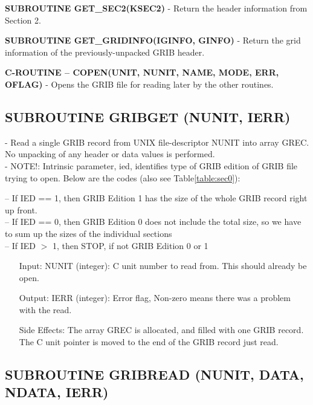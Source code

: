 \textbf{SUBROUTINE GET\_SEC2(KSEC2) }
      - Return the header information from Section 2.                         
                                                                           
\textbf{SUBROUTINE GET\_GRIDINFO(IGINFO, GINFO) }
      - Return the grid information of the previously-unpacked GRIB header.   

\textbf{C-ROUTINE -- COPEN(UNIT, NUNIT, NAME, MODE, ERR, OFLAG)}
      - Opens the GRIB file for reading later by the other routines. 


\subsection{ SUBROUTINE GRIBGET (NUNIT, IERR)} 
  
    - Read a single GRIB record from UNIX file-descriptor NUNIT into array   
        GREC. No unpacking of any header or data values is performed.   \\
    - NOTE!:  Intrinsic parameter, ied, identifies type of GRIB edition of GRIB file trying to open.  Below are the codes (also see Table\ref{table:sec0}):

     -- If IED == 1, then GRIB Edition 1 has the size of the whole GRIB record right up front.\\
     -- If IED == 0, then GRIB Edition 0 does not include the total size, so we have to sum up  the sizes of the individual sections \\
     -- If IED $>$ 1, then STOP, if not GRIB Edition 0 or 1\\

\begin{itemize}
 \item[Input: ]
     NUNIT (integer):  C unit number to read from.  This should already be open. \item[Output:]      
     IERR (integer): Error flag, Non-zero means there was a problem with the read.    
                                                                           
\item[Side Effects:]                                                             
        The array GREC is allocated, and filled with one GRIB record.      
        The C unit pointer is moved to the end of the GRIB record just read. 
\end{itemize}


\subsection{SUBROUTINE GRIBREAD (NUNIT, DATA, NDATA, IERR) }
   
